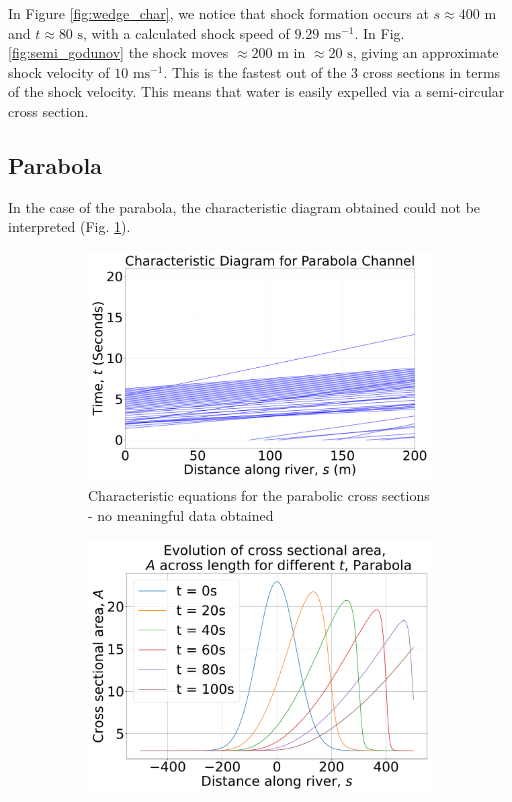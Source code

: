 \documentclass[12pt]{article}
\begin{document}
In Figure \ref{fig:wedge_char}, we notice that shock formation occurs at $s \approx 400\text{ m}$ and $t\approx 80\text{ s}$, with a calculated shock speed of $ 9.29\text{ ms}^{-1}$. In Fig. \ref{fig:semi_godunov} the shock moves $\approx200\text{ m}$ in $\approx 20 \text{ s}$, giving an approximate shock velocity of $ 10\text{ ms}^{-1}$. This is the fastest out of the 3 cross sections in terms of the shock velocity. This means that water is easily expelled via a semi-circular cross section.

\subsection{Parabola}
In the case of the parabola, the characteristic diagram obtained could not be interpreted (Fig. \ref{fig:parab_char}).
\begin{figure}[h]
    \centering
    \begin{subfigure}[b]{0.49\textwidth}
        \centering
        \includegraphics[width=\textwidth]{Figures/Parabola_characteristic.pdf}
        \caption{Characteristic equations for the parabolic cross sections - no meaningful data obtained}
        \label{fig:parab_char}
    \end{subfigure}
    \hfill
    \begin{subfigure}[b]{0.49\textwidth}
        \centering
        \includegraphics[width=\textwidth]{Figures/Parabola_godunov.pdf}

\end{subfigure}
\end{figure}
\end{document}
